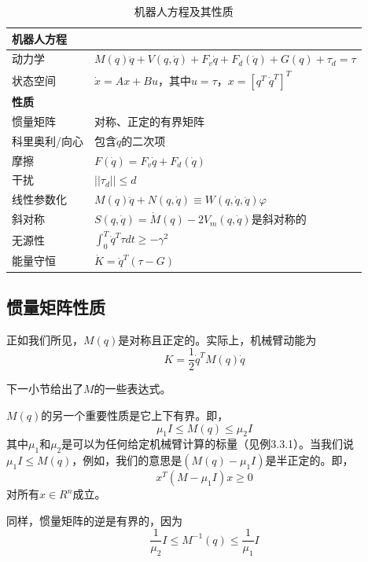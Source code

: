 \documentclass[12pt,a4paper]{ctexart}
\begin{document}
\begin{table}[htbp]
\centering
\caption{机器人方程及其性质}
\begin{tabular}{|l|l|}
\hline
\textbf{机器人方程} & \\
\hline
动力学 & $M(q)\ddot{q} + V(q,\dot{q}) + F_v\dot{q} + F_d(\dot{q}) + G(q) + \tau_d = \tau$ \\
\hline
状态空间 & $\dot{x} = Ax + Bu$，其中$u = \tau$，$x = [q^T \ \dot{q}^T]^T$ \\
\hline
\textbf{性质} & \\
\hline
惯量矩阵 & 对称、正定的有界矩阵 \\
\hline
科里奥利/向心 & 包含$\dot{q}$的二次项 \\
\hline
摩擦 & $F(\dot{q}) = F_v\dot{q} + F_d(\dot{q})$ \\
\hline
干扰 & $||\tau_d|| \leq d$ \\
\hline
线性参数化 & $M(q)\ddot{q}+N(q,\dot{q})\equiv W(q,\dot{q},\ddot{q})\varphi$ \\
\hline
斜对称 & $S(q,\dot{q}) = \dot{M}(q) - 2V_m(q,\dot{q})$是斜对称的 \\
\hline
无源性 & $\int_0^T \dot{q}^T\tau dt \geq -\gamma^2$ \\
\hline
能量守恒 & $\dot{K} = \dot{q}^T(\tau - G)$ \\
\hline
\end{tabular}
\end{table}

\subsection{惯量矩阵性质}

正如我们所见，$M(q)$是对称且正定的。实际上，机械臂动能为
\begin{equation}
K = \frac{1}{2}\dot{q}^T M(q) \dot{q}
\end{equation}

下一小节给出了$M$的一些表达式。

$M(q)$的另一个重要性质是它上下有界。即，
\begin{equation}
\mu_1 I \leq M(q) \leq \mu_2 I
\end{equation}
其中$\mu_1$和$\mu_2$是可以为任何给定机械臂计算的标量（见例3.3.1）。当我们说$\mu_1 I \leq M(q)$，例如，我们的意思是$(M(q) - \mu_1 I)$是半正定的。即，
\begin{equation}
x^T(M - \mu_1 I)x \geq 0
\end{equation}
对所有$x \in R^n$成立。

同样，惯量矩阵的逆是有界的，因为
\begin{equation}
\frac{1}{\mu_2} I \leq M^{-1}(q) \leq \frac{1}{\mu_1} I
\end{equation}
\end{document}
